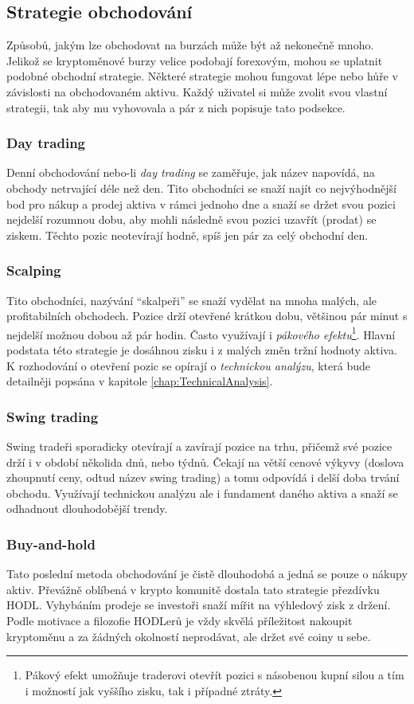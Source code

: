 \subsection{Strategie obchodování}
Způsobů, jakým lze obchodovat na burzách může být až nekonečně mnoho. Jelikož se kryptoměnové burzy velice podobají forexovým, mohou se uplatnit podobné
obchodní strategie. Některé strategie mohou fungovat lépe nebo hůře v závislosti na obchodovaném aktivu.
Každý uživatel si může zvolit svou vlastní strategii, tak aby mu vyhovovala a pár z nich popisuje tato podsekce.

\subsubsection{Day trading}
Denní obchodování nebo-li \emph{day trading} se zaměřuje, jak název napovídá, na obchody netrvající déle než den. Tito obchodníci se snaží najít co nejvýhodnější
bod pro nákup a prodej aktiva v rámci jednoho dne a snaží se držet svou pozici nejdelší rozumnou dobu, aby mohli následně svou pozici uzavřít (prodat) se ziskem.
Těchto pozic neotevírají hodně, spíš jen pár za celý obchodní den.

\subsubsection{Scalping}
\label{subsubsec:scalping}
Tito obchodníci, nazývání \enquote{skalpeři} se snaží vydělat na mnoha malých, ale profitabilních obchodech. Pozice drží otevřené krátkou dobu, většinou pár minut
s nejdelší možnou dobou až pár hodin. Často využívají i \emph{pákového efektu}\footnote{Pákový efekt umožňuje traderovi otevřít pozici s násobenou kupní silou
    a tím i možností jak vyššího zisku, tak i případné ztráty.}. Hlavní podstata této strategie je dosáhnou zisku i z malých změn tržní hodnoty aktiva.
K rozhodování o otevření pozic se opírají o \emph{technickou analýzu}, která bude detailněji popsána v kapitole \ref{chap:TechnicalAnalysis}.

\subsubsection{Swing trading}
Swing tradeři sporadicky otevírají a zavírají pozice na trhu, přičemž své pozice drží i v období několida dnů, nebo týdnů. Čekají na větší cenové
výkyvy (doslova zhoupnutí ceny, odtud název swing trading) a tomu odpovídá i delší doba trvání obchodu. Využívají technickou analýzu ale i fundament
daného aktiva a snaží se odhadnout dlouhodobější trendy.

\subsubsection{Buy-and-hold}
Tato poslední metoda obchodování je čistě dlouhodobá a jedná se pouze o nákupy aktiv. Převážně oblíbená v krypto komunitě dostala tato strategie přezdívku HODL.
Vyhybáním prodeje se investoři snaží mířit na výhledový zisk z držení. Podle motivace a filozofie HODLerů je vždy skvělá příležitost nakoupit kryptoměnu a za
žádných okolností neprodávat, ale držet své coiny u sebe.

\endinput